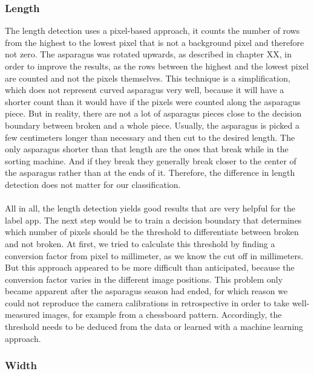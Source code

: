 \subsubsection{Length}

The length detection uses a pixel-based approach, it counts the number of rows from the highest to the lowest pixel that is not a background pixel and therefore not zero. The asparagus was rotated upwards, as described in chapter XX, in order to improve the results, as the rows between the highest and the lowest pixel are counted and not the pixels themselves. This technique is a simplification, which does not represent curved asparagus very well, because it will have a shorter count than it would have if the pixels were counted along the asparagus piece. But in reality, there are not a lot of asparagus pieces close to the decision boundary between broken and a whole piece. Usually, the asparagus is picked a few centimeters longer than necessary and then cut to the desired length. The only asparagus shorter than that length are the ones that break while in the sorting machine. And if they break they generally break closer to the center of the asparagus rather than at the ends of it. Therefore, the difference in length detection does not matter for our classification. \\
\\
All in all, the length detection yields good results that are very helpful for the label app. The next step would be to train a decision boundary that determines which number of pixels should be the threshold to differentiate between broken and not broken. At first, we tried to calculate this threshold by finding a conversion factor from pixel to millimeter, as we know the cut off in millimeters. But this approach appeared to be more difficult than anticipated, because the conversion factor varies in the different image positions. This problem only became apparent after the asparagus season had ended, for which reason we could not reproduce the camera calibrations in retrospective in order to take well-measured images, for example from a chessboard pattern. Accordingly, the threshold needs to be deduced from the data or learned with a machine learning approach.

\subsubsection{Width}

